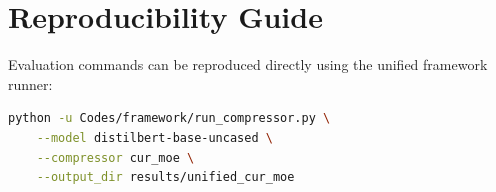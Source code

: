 \section{Reproducibility Guide}
Evaluation commands can be reproduced directly using the unified framework runner:
\begin{lstlisting}[language=bash]
python -u Codes/framework/run_compressor.py \
    --model distilbert-base-uncased \
    --compressor cur_moe \
    --output_dir results/unified_cur_moe
\end{lstlisting}
